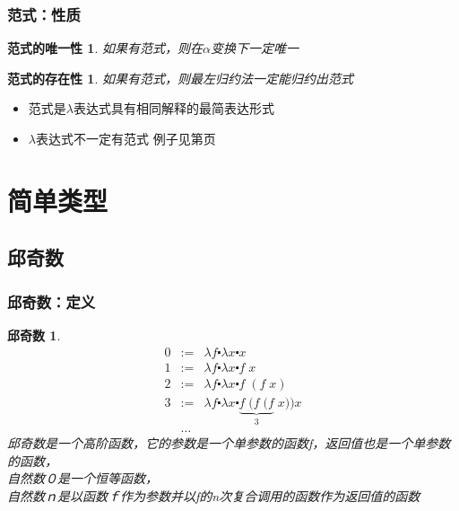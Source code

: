 \documentclass[CJKutf8,compress,hyperref]{beamer}
\begin{document}
\begin{CJK}{UTF8}{song}
\begin{frame}
  \frametitle{范式：性质} 
  \newtheorem{Parad_uniq}{范式的唯一性} 
  \begin{Parad_uniq}
    如果有范式，则在$\alpha$变换下一定唯一 
  \end{Parad_uniq}
  \newtheorem{Parad_exist}{范式的存在性} 
  \begin{Parad_exist}
    如果有范式，则最左归约法一定能归约出范式 
  \end{Parad_exist}
  \begin{itemize}
  \item 范式是$\lambda$表达式具有相同解释的最简表达形式 
  \item $\lambda$表达式不一定有范式 例子见第\pageref{ambig}页
  \end{itemize}
\end{frame} 

\section{简单类型}

\subsection{邱奇数}
\begin{frame}
  \frametitle{邱奇数：定义}
  \newtheorem{churchNo}{邱奇数} 
  \begin{churchNo}
    \begin{eqnarray*}
      0 & := & \lambda f \centerdot \lambda x \centerdot x \\ 
      1 & := & \lambda f \centerdot \lambda x \centerdot f \; x \\ 
      2 & := & \lambda f \centerdot \lambda x \centerdot f \; (f \;x) \\ 
      3 & := & \lambda f \centerdot \lambda x \centerdot \underbrace{f \; (f \; (f}_3 \;x))x \\ 
        & \dots &  
    \end{eqnarray*} 
    邱奇数是一个高阶函数，它的参数是一个单参数的函数f，返回值也是一个单参数的函数，　\\
    自然数０是一个恒等函数， \\
    自然数ｎ是以函数ｆ作为参数并以f的n次复合调用的函数作为返回值的函数
  \end{churchNo}
\end{frame} 


\end{CJK}
\end{document}
